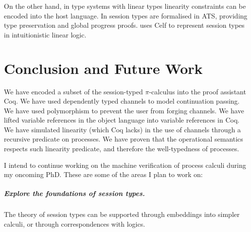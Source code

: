 \documentclass{mproj}
\newcommand{\picalc}{$\pi$-calculus}
\begin{document}
On the other hand, in type systems with linear types linearity constraints can be encoded into the host language. In \cite{Xi2016} session types are formalised in ATS, providing type preservation and global progress proofs. \cite{Bock2016} uses Celf to represent session types in intuitionistic linear logic.

\chapter{Conclusion and Future Work}\label{conclusion}


We have encoded a subset of the session-typed \picalc{} into the proof assistant Coq. We have used dependently typed channels to model continuation passing. We have used polymorphism to prevent the user from forging channels. We have lifted variable references in the object language into variable references in Coq. We have simulated linearity (which Coq lacks) in the use of channels through a recursive predicate on processes. We have proven that the operational semantics respects such linearity predicate, and therefore the well-typedness of processes.

I intend to continue working on the machine verification of process calculi during my oncoming PhD. These are some of the areas I plan to work on:

\paragraph{Explore the foundations of session types.} \hfill

The theory of session types can be supported through embeddings into simpler calculi, or through correspondences with logics.
\end{document}
